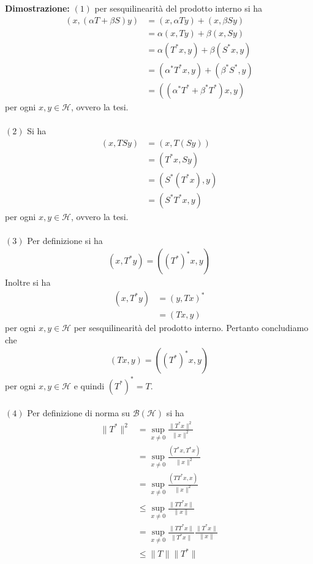 \documentclass{article}
\numberwithin{equation}{subsection}
\begin{document}
\textbf{Dimostrazione:} $(1)$ per sesquilinearità del prodotto interno si ha 
\begin{align*}
    (x, (\alpha T + \beta S)y) &= (x, \alpha T y) + (x, \beta S y)  \\
    &= \alpha(x, Ty) + \beta(x, Sy)  \\
    &= \alpha(T^*x, y) + \beta(S^*x, y)  \\
    &= (\alpha^*T^*x, y) + (\beta^*S^*, y)  \\
    &= ((\alpha^*T^* + \beta^*T^*)x, y) 
\end{align*}
per ogni $x, y \in \mathcal{H}$, ovvero la tesi. \\ \\
$(2)$ Si ha 
\begin{align*}
    (x, TSy) &= (x, T(Sy))  \\
    &= (T^*x, Sy)  \\
    &= (S^*(T^*x), y)  \\
    &= (S^*T^*x, y) 
\end{align*}
per ogni $x, y \in \mathcal{H}$, ovvero la tesi. \\ \\
$(3)$ Per definizione si ha 
\begin{align*}
    (x, T^*y) = ((T^*)^*x, y) 
\end{align*}
Inoltre si ha 
\begin{align*}
    (x, T^*y) &= (y, Tx)^*  \\
    &= (Tx, y) 
\end{align*}
per ogni $x, y \in \mathcal{H}$ per sesquilinearità del prodotto interno. Pertanto concludiamo che 
\begin{align*}
    (Tx, y) = ((T^*)^*x, y) 
\end{align*}
per ogni $x, y \in \mathcal{H}$ e quindi $(T^*)^* = T$. \\ \\
$(4)$ Per definizione di norma su $\mathcal{B}(\mathcal{H})$ si ha 
\begin{align*}
    \|T^*\|^2 &= \sup_{x \neq 0}\frac{\|T^*x\|^2}{\|x\|^2}  \\
    &= \sup_{x \neq 0}\frac{(T^*x, T^*x)}{\|x\|^2}  \\
    &= \sup_{x \neq 0}\frac{(TT^*x, x)}{\|x\|^2}  \\
    &\leq \sup_{x \neq 0}\frac{\|TT^*x\|}{\|x\|}  \\
    &= \sup_{x \neq 0}\frac{\|TT^*x\|}{\|T^*x\|}\frac{\|T^*x\|}{\|x\|}  \\
    &\leq \|T\|\|T^*\| 
\end{align*}
\end{document}

